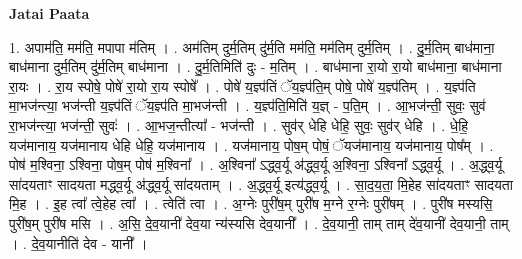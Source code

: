 \documentclass[17pt]{extarticle}
\begin{document}
\textbf{Jatai Paata} \newline

1. अपाम॑ति॒ मम॑ति॒ मपापा म॑तिम् । . अम॑तिम् दुर्म॒तिम् दु॑र्म॒ति मम॑ति॒ मम॑तिम् दुर्म॒तिम् । . दु॒र्म॒तिम् बाध॑माना॒ बाध॑माना दुर्म॒तिम् दु॑र्म॒तिम् बाध॑माना । . दु॒र्म॒तिमिति॑ दुः - म॒तिम् । . बाध॑माना रा॒यो रा॒यो बाध॑माना॒ बाध॑माना रा॒यः । . रा॒य स्पोषे॒ पोषे॑ रा॒यो रा॒य स्पोषे᳚ । . पोषे॑ य॒ज्ञ्प॑तिं ॅय॒ज्ञ्प॑ति॒म् पोषे॒ पोषे॑ य॒ज्ञ्प॑तिम् । . य॒ज्ञ्प॑ति मा॒भज॑न्त्या॒ भज॑न्ती य॒ज्ञ्प॑तिं ॅय॒ज्ञ्प॑ति मा॒भज॑न्ती । . य॒ज्ञ्प॑ति॒मिति॑ य॒ज्ञ् - प॒ति॒म् । . आ॒भज॑न्ती॒ सुवः॒ सुव॑ रा॒भज॑न्त्या॒ भज॑न्ती॒ सुवः॑ । . आ॒भज॒न्तीत्या᳚ - भज॑न्ती । . सुव॑र् धेहि धेहि॒ सुवः॒ सुव॑र् धेहि । . धे॒हि॒ यज॑मानाय॒ यज॑मानाय धेहि धेहि॒ यज॑मानाय । . यज॑मानाय॒ पोष॒म् पोषं॒ ॅयज॑मानाय॒ यज॑मानाय॒ पोष᳚म् । . पोष॑ म॒श्विना॒ ऽश्विना॒ पोष॒म् पोष॑ म॒श्विना᳚ । . अ॒श्विना᳚ ऽद्ध्व॒र्यू अ॑द्ध्व॒र्यू अ॒श्विना॒ ऽश्विना᳚ ऽद्ध्व॒र्यू । . अ॒द्ध्व॒र्यू सा॑दयताꣳ सादयता मद्ध्व॒र्यू अ॑द्ध्व॒र्यू सा॑दयताम् । . अ॒द्ध्व॒र्यू इत्य॑द्ध्व॒र्यू । . सा॒द॒य॒ता॒ मि॒हेह सा॑दयताꣳ सादयता मि॒ह । . इ॒ह त्वा᳚ त्वे॒हेह त्वा᳚ । . त्वेति॑ त्वा । . अ॒ग्नेः पुरी॑ष॒म् पुरी॑ष म॒ग्ने र॒ग्नेः पुरी॑षम् । . पुरी॑ष मस्यसि॒ पुरी॑ष॒म् पुरी॑ष मसि । . अ॒सि॒ दे॒व॒यानी॑ देव॒या न्य॑स्यसि देव॒यानी᳚ । . दे॒व॒यानी॒ ताम् ताम् दे॑व॒यानी॑ देव॒यानी॒ ताम् । . दे॒व॒यानीति॑ देव - यानी᳚ । \newline
\end{document}
